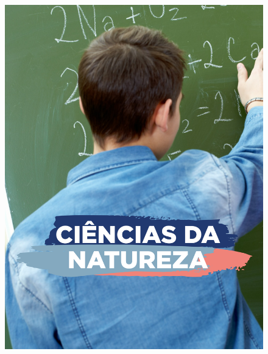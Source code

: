 \begin{figure}[htpb]
\vspace*{-2.5cm}
\hspace*{-2.5cm}\includegraphics[height=\paperheight]{../separadores/separadorCNT9A.png}
\end{figure}
\pagebreak
